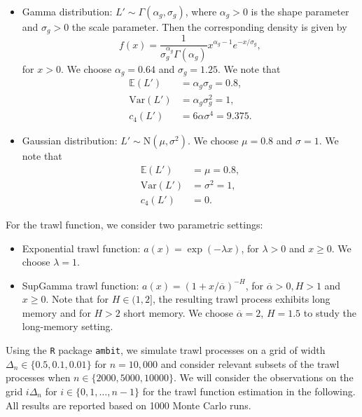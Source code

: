 \documentclass{article}
\theoremstyle{plain}
\theoremstyle{definition}
\theoremstyle{remark}
\begin{document}
\begin{appendix}
\begin{itemize}
	\item Gamma distribution: $L'\sim \Gamma(\alpha_g, \sigma_g)$, where
	$\alpha_g>0$ is the shape parameter and $\sigma_g>0$ the scale parameter.
	Then the
	corresponding density is given by
	$$
	f(x)=\frac{1}{\sigma_g^{\alpha_g}\Gamma(\alpha_{g})}x^{\alpha_g-1}e^{-x/\sigma_g},
	$$
	for $x>0$. 
	We choose $\alpha_g =0.64$ and $\sigma_g =1.25$. 
	We note that 
	\begin{align*}
		\mathbb{E}(L')&=\alpha_g \sigma_g=0.8,\\
		\mathrm{Var}(L')&=\alpha_g \sigma_g^2=1,\\
		c_4(L')&=6\alpha \sigma^4=9.375.
	\end{align*}
	\item Gaussian distribution: 
	$L'\sim \mathrm{N}(\mu, \sigma^2)$. We choose $\mu=0.8$ and $\sigma=1$. 
	We note that 	\begin{align*}
		\mathbb{E}(L')&=\mu=0.8,\\
		\mathrm{Var}(L')&=\sigma^2=1,\\
		c_4(L')&=0.
	\end{align*}
\end{itemize}
For the trawl function, we consider two parametric settings:
\begin{itemize}
	\item Exponential trawl function: $a(x)=\exp(-\lambda x)$, for $\lambda >0$ and $x\geq 0$. We choose $\lambda =1$.
	\item SupGamma trawl function: $a(x) = (1+x/\overline{\alpha})^{-H}$, for $\overline{\alpha}>0, H>1$ and $x\geq 0$. Note that for $H\in (1,2]$, the resulting trawl process exhibits long memory and for $H> 2$ short memory. We choose $\overline{\alpha}=2$, 
    $H=1.5$ to study the long-memory setting. 
\end{itemize}
Using the {\tt R} package {\tt ambit}, we simulate trawl processes on a grid of width $\Delta_n \in \{0.5, 0.1, 0.01\}$ for $n=10,000$ and consider relevant subsets of the trawl processes when $n \in \{2000, 5000, 10000\}$.
We will consider the observations on the grid $i\Delta_n$ for $i\in \{0, 1, \ldots, n-1\}$ for the trawl function estimation in the following.
All results are reported based on 1000 Monte Carlo runs. 


\end{appendix}
\end{document}
